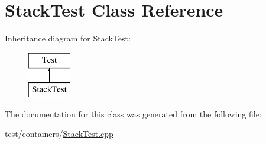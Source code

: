 \hypertarget{class_stack_test}{}\section{Stack\+Test Class Reference}
\label{class_stack_test}
Inheritance diagram for Stack\+Test\+:\begin{figure}[H]
\begin{center}
\leavevmode
\includegraphics[height=2.000000cm]{class_stack_test}
\end{center}
\end{figure}


The documentation for this class was generated from the following file\+:\begin{DoxyCompactItemize}
\item 
test/containers/\hyperlink{_stack_test_8cpp}{Stack\+Test.\+cpp}\end{DoxyCompactItemize}
